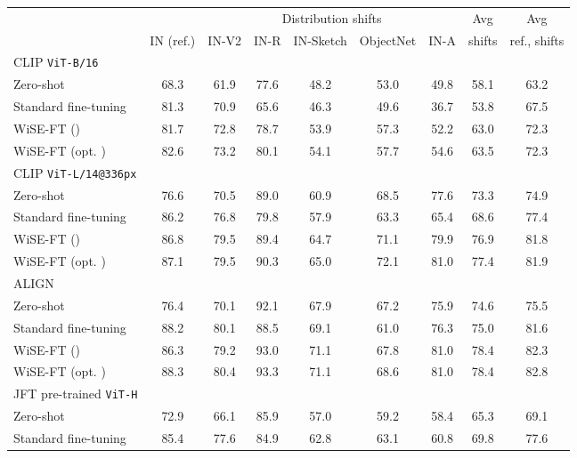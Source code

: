 \begin{table*}
\setlength\tabcolsep{5.1pt}
\small
\begin{center}
\begin{tabular}{lc|ccccc|cc}
\toprule
{} &            &             \multicolumn{5}{c|}{Distribution shifts}             & Avg &     Avg\\
{} &           IN (ref.) &             IN-V2 &              IN-R &                 IN-Sketch &                 ObjectNet &              IN-A & shifts &     ref., shifts\\
\midrule
CLIP \texttt{ViT-B/16} \cite{radford2021learning} &  &  &  &  &  &  &  &  \\
\quad Zero-shot & 68.3 & 61.9 & 77.6 & 48.2 & 53.0 & 49.8 & 58.1 & 63.2 \\
\quad Standard fine-tuning & 81.3 & 70.9 & 65.6 & 46.3 & 49.6 & 36.7 & 53.8 & 67.5 \\
\quad WiSE-FT () & 81.7 & 72.8 & 78.7 & 53.9 & 57.3 & 52.2 & 63.0 &  72.3 \\
\quad WiSE-FT (opt. ) & 82.6 & 73.2 & 80.1 & 54.1 & 57.7 & 54.6 & 63.5 &  72.3 \\
CLIP \texttt{ViT-L/14@336px} \cite{radford2021learning} &  &  &  &  &  &  &  &  \\
\quad Zero-shot & 76.6 & 70.5 & 89.0 & 60.9 & 68.5 & 77.6 & 73.3 & 74.9 \\
\quad Standard fine-tuning & 86.2 & 76.8 & 79.8 & 57.9 & 63.3 & 65.4 &  68.6 & 77.4 \\
\quad WiSE-FT () & 86.8 &  79.5 & 89.4 & 64.7 & 71.1 & 79.9 & 76.9 & 81.8 \\
\quad WiSE-FT (opt. ) & 87.1 & 79.5 & 90.3 & 65.0 & 72.1 & 81.0 & 77.4 &  81.9 \\
ALIGN \cite{jia2021scaling} & & & & & & & & \\
\quad Zero-shot & 76.4 & 70.1 & 92.1 & 67.9 & 67.2 & 75.9 & 74.6 & 75.5 \\
\quad Standard fine-tuning & 88.2 & 80.1 & 88.5 & 69.1 & 61.0 & 76.3 & 75.0 & 81.6 \\
\quad WiSE-FT () & 86.3 & 79.2 & 93.0 & 71.1 & 67.8 & 81.0 & 78.4 & 82.3 \\
\quad WiSE-FT (opt. ) & 88.3 & 80.4 & 93.3 & 71.1 & 68.6 & 81.0 & 78.4 &  82.8 \\
JFT pre-trained \texttt{ViT-H} \cite{dosovitskiy2021an} &  &  &  &  &  &  &  &  \\
\quad Zero-shot & 72.9 & 66.1 & 85.9 & 57.0 & 59.2 & 58.4 & 65.3 & 69.1 \\
\quad Standard fine-tuning & 85.4 & 77.6 & 84.9 & 62.8 & 63.1 & 60.8 & 69.8 & 77.6 \\

\end{tabular}
\end{center}
\end{table*}
